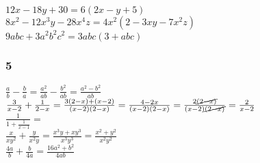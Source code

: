 \documentclass[]{report}
\begin{document}
$ 12x - 18y + 30 = 6(2x - y + 5)$ \\
$ 8x^2 - 12x^3y - 28x^4z = 4x^2(2 - 3xy -7x^2z)$ \\
$ 9abc + 3a^2b^2c^2 = 3abc(3 + abc) $

\subsubsection{5}

$ \frac{a}{b} - \frac{b}{a} = \frac{a^2}{ab} - \frac{b^2}{ab} = \frac{a^2-b^2}{ab} $\\
$\frac{3}{x - 2}  + \frac{1}{2-x} = \frac{3(2-x) + (x-2)}{(x-2)(2-x)} = \frac{4 - 2x}{(x-2)(2-x)} =\frac{2\cancel{(2 - x)}}{(x-2)\cancel{(2-x)}} = \frac{2}{x-2}$\\
$\frac{1}{1 + \frac{1}{x-1}} = $ \\
$\frac{x}{xy^2} + \frac{y}{x^2y} = \frac{x^3y + xy^3}{x^3y^3} = \frac{x^2 + y^2}{x^2y^2}$ \\
$\frac{4a}{b} + \frac{b}{4a} = \frac{16a^2 + b^2}{4ab}$
\end{document}
